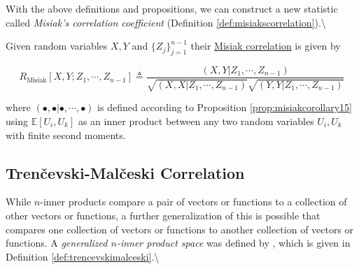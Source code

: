\documentclass[
  letterpaper,
  DIV=11,
  numbers=noendperiod]{scrreprt}
\begin{document}
With the above definitions and propositions, we can construct a new
statistic called \textit{Misiak's correlation coefficient} (Definition
\ref{def:misiakscorrelation}).\textbackslash{}

\begin{Definition}[mydefinition=Misiak's Correlation Coefficient, label=def:misiakcorrelation]
Given random variables $X,Y$ and $\{ Z_j \}_{j=1}^{n-1}$ their \underline{Misiak correlation} is given by

$$R_{\text{Misiak}}[X, Y ; Z_1, \cdots, Z_{n-1}] \triangleq \frac{(X, Y | Z_1, \cdots, Z_{n-1})}{\sqrt{(X, X | Z_1, \cdots, Z_{n-1})} \sqrt{(Y, Y | Z_1, \cdots, Z_{n-1})} }$$

where $( \bullet, \bullet | \bullet, \cdots, \bullet )$ is defined according to Proposition \ref{prop:misiakcorollary15} using $\mathbb{E}[U_i, U_k]$ as an inner product between any two random variables $U_i, U_k$ with finite second moments.
\label{def:misiakscorrelation}
\end{Definition}

\subsection{\texorpdfstring{Tren\v cevski-Mal\v ceski
Correlation}{Trenevski-Maleski Correlation}}\label{trenevski-maleski-correlation}

While \(n\)-inner products compare a pair of vectors or functions to a
collection of other vectors or functions, a further generalization of
this is possible that compares one collection of vectors or functions to
another collection of vectors or functions. A
\textit{generalized $n$-inner product space} was defined by
\cite{trencevski2006}, which is given in Definition
\ref{def:trencevskimalceski}.\textbackslash{}
\end{document}
